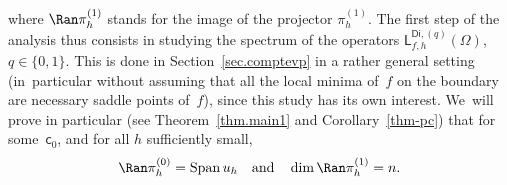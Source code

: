\documentclass[10pt]{amsart}
\newcommand{\quand}{\quad\text{and}\quad}
\DeclareMathOperator{\Span}{Span}
\theoremstyle{plain}
\theoremstyle{definition}
\begin{document}
where $\Ran \pi_h^{(1)}$ stands for the image of the projector $\pi_h^{(1)}$.
The first step of the analysis thus consists in studying the spectrum
of the operators $\mathsf
L^{\mathsf{Di},(q)}_{f,h}(\Omega)$, $q\in\{0,1\}$. This is done in
Section~\ref{sec.comptevp} in a rather general setting (in~particular
without assuming that all the local minima of~$f$ on the boundary are
necessary saddle points of~$f$), since this
study has its own interest. We~will prove in
particular
(see Theorem~\ref{thm.main1} and Corollary~\ref{thm-pc}) that for
some~$\mathsf
c_0$, and for all $h$ sufficiently small,\vspace*{-3pt}
\begin{equation}\label{eq.dim-no}
\Ran \pi_h^{(0)} = \Span u_h \quand \dim \Ran \pi_h^{(1)} =n.
\end{equation}
\end{document}
